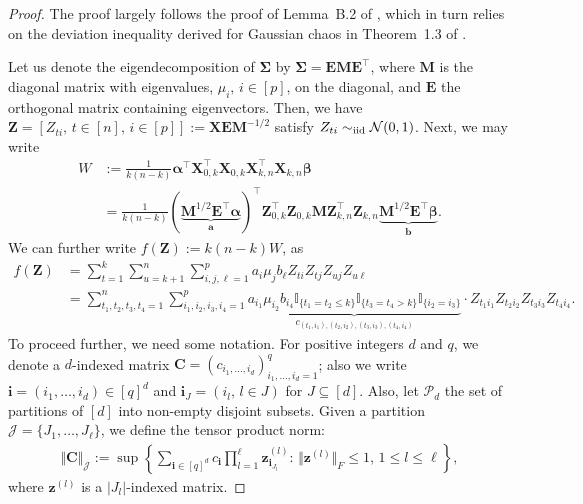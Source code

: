 \documentclass[11pt, a4paper]{article}
\newcommand{\mbf}{\mathbf}
\newcommand{\mc}{\mathcal}
\renewcommand{\l}{\left}
\renewcommand{\r}{\right}
\newcommand{\iid}{\text{\upshape iid}}
\theoremstyle{definition}
\theoremstyle{definition}
\theoremstyle{definition}
\theoremstyle{definition}
\theoremstyle{definition}
\theoremstyle{remark}
\theoremstyle{definition}
\theoremstyle{definition}
\theoremstyle{definition}
\begin{document}
\begin{proof}
The proof largely follows the proof of Lemma~B.2 of \cite{VeGa18}, which in turn relies on the deviation inequality derived for Gaussian chaos in Theorem~1.3 of \cite{adamczak2015concentration}. 

Let us denote the eigendecomposition of $\bm\Sigma$ by $\bm\Sigma = \mbf E\mbf M \mbf E^\top$, where $\mbf M$ is the diagonal matrix with eigenvalues, $\mu_i, \, i \in [p]$, on the diagonal, and $\mbf E$ the orthogonal matrix containing eigenvectors.
Then, we have $\mbf Z = [Z_{ti}, \, t \in [n], \, i \in [p]] := \mbf X \mbf E \mbf M^{-1/2}$ satisfy $Z_{ti} \sim_{\iid} \mc N(0, 1)$.
Next, we may write
\begin{align*}
W &:= \frac{1}{k (n - k)} \bm\alpha^\top \mbf X_{0, k}^\top \mbf X_{0, k} \mbf X_{k, n}^\top \mbf X_{k, n} \bm\beta
\\
&= \frac{1}{k (n - k)} (\underbrace{\mbf M^{1/2} \mbf E^\top \bm\alpha}_{\mbf a})^\top \mbf Z_{0, k}^\top \mbf Z_{0, k} \mbf M \mbf Z_{k, n}^\top \mbf Z_{k, n} \underbrace{\mbf M^{1/2} \mbf E^\top \bm\beta}_{\mbf b}.
\end{align*}
We can further write $f(\mbf Z) := k (n - k) W$, as
\begin{align*}
f(\mbf Z) &= \sum_{t = 1}^k \sum_{u = k + 1}^n \sum_{i, j, \ell = 1}^p a_i \mu_j b_\ell Z_{t i} Z_{t j} Z_{u j} Z_{u \ell}
\\
&= \sum_{t_1, t_2, t_3, t_4 = 1}^n \sum_{i_1, i_2, i_3, i_4 = 1}^p \underbrace{a_{i_1} \mu_{i_2} b_{i_4} \mathbb{I}_{\{t_1 = t_2 \le k\}} \mathbb{I}_{\{t_3 = t_4 > k \}} \mathbb{I}_{\{i_2 = i_3\}}}_{c_{(t_1, i_1), (t_2, i_2), (t_3, i_3), (t_4, i_4)}} \cdot Z_{t_1 i_1} Z_{t_2 i_2} Z_{t_3 i_3} Z_{t_4 i_4}.
\end{align*}
To proceed further, we need some notation. 
For positive integers $d$ and $q$, we denote a $d$-indexed matrix $\mbf C = (c_{i_1, \ldots, i_d})_{i_1, \ldots,  i_d = 1}^q$; also we write $\mbf i = ( i_1, \ldots,  i_d) \in [q]^d$ and $\mbf i_J = ( i_l, \, l \in J)$ for $J \subseteq [d]$.
Also, let $\mc P_d$ the set of partitions of $[d]$ into non-empty disjoint subsets.
Given a partition $\mc J = \{J_1, \ldots, J_\ell\}$, we define the tensor product norm:%
\begin{align*}
\Vert \mbf C \Vert_{\mc J} := \sup\l\{ \sum_{\mbf i \in [q]^d} c_{\mbf i} \prod_{l = 1}^\ell \mbf z^{(l)}_{\mbf i_{J_l}} : \, \Vert \mbf z^{(l)} \Vert_F \le 1, \, 1 \le l \le \ell \r\},
\end{align*}
where $\mbf z^{(l)}$ is a $\vert J_l \vert$-indexed matrix.

\end{proof}
\end{document}
